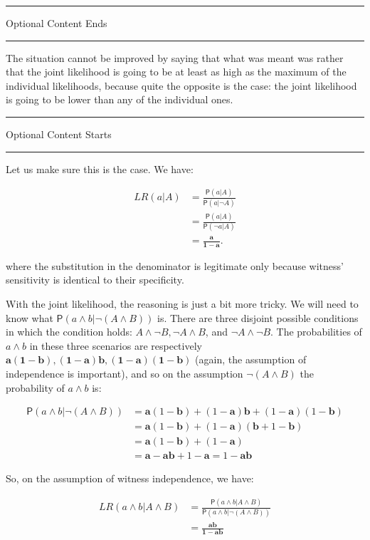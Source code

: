 \documentclass[10pt,dvipsnames,enabledeprecatedfontcommands]{scrartcl}
\newcommand{\n}{\neg}
\newcommand{\et}{\wedge}
\newcommand{\pr}[1]{\mathsf{P}(#1)}
\newcommand{\intermezzoa}{
	\begin{minipage}[c]{13cm}
	\begin{center}\rule{10cm}{0.4pt}



	\tiny{\sc Optional Content Starts}
	
	\vspace{-1mm}
	
	\rule{10cm}{0.4pt}\end{center}
	\end{minipage}\nopagebreak 
	}
\newcommand{\intermezzob}{\nopagebreak 
	\begin{minipage}[c]{13cm}
	\begin{center}\rule{10cm}{0.4pt}

	\tiny{\sc Optional Content Ends}
	
	\vspace{-1mm}
	
	\rule{10cm}{0.4pt}\end{center}
	\end{minipage}
	}
\begin{document}
\intermezzob

The situation cannot be improved by saying that what was meant was
rather that the joint likelihood is going to be at least as high as the
maximum of the individual likelihoods, because quite the opposite is the
case: the joint likelihood is going to be lower than any of the
individual ones.

\intermezzoa

Let us make sure this is the case. We have:

\begin{align*}
 LR(a\vert A) & = \frac{\pr{a\vert A}}{\pr{a\vert \n A}}\\
 &= \frac{\pr{a\vert A}}{\pr{\n a\vert  A}} \\
& =  \frac{\mathbf{a}}{\mathbf{1-a}}.
\end{align*}

where the substitution in the denominator is legitimate only because
witness' sensitivity is identical to their specificity.

With the joint likelihood, the reasoning is just a bit more tricky. We
will need to know what \(\pr{a\et b \vert \n (A\et B)}\) is. There are
three disjoint possible conditions in which the condition holds:
\(A\et \n B, \n A \et B\), and \(\n A \et \n B\). The probabilities of
\(a\et b\) in these three scenarios are respectively
\(\mathbf{a(1-b),(1-a)b,(1-a)(1-b)}\) (again, the assumption of
independence is important), and so on the assumption \(\n(A\et B)\) the
probability of \(a\et b\) is:

\begin{align*}
\pr{a\et b \vert \n (A\et B)} & = 
\mathbf{a}(1-\mathbf{b})+(1-\mathbf{a})\mathbf{b}+(1-\mathbf{a})(1-\mathbf{b})\\ 
& = 
\mathbf{a}(1-\mathbf{b})+(1-\mathbf{a})(\mathbf{b} + 1-\mathbf{b})\\
& = \mathbf{a}(1-\mathbf{b})+(1-\mathbf{a})\\
& = \mathbf{a}-\mathbf{a}\mathbf{b}+1-\mathbf{a} = 1- \mathbf{a}\mathbf{b}
\end{align*}

So, on the assumption of witness independence, we have:

\begin{align*}
LR(a\et b \vert A \et B) & = \frac{\pr{a\et b \vert A \et B}}{\pr{a \et b\vert \n (A \et B)}} \\
& = \frac{\mathbf{ab}}{\mathbf{1-ab}}
\end{align*}
\end{document}
